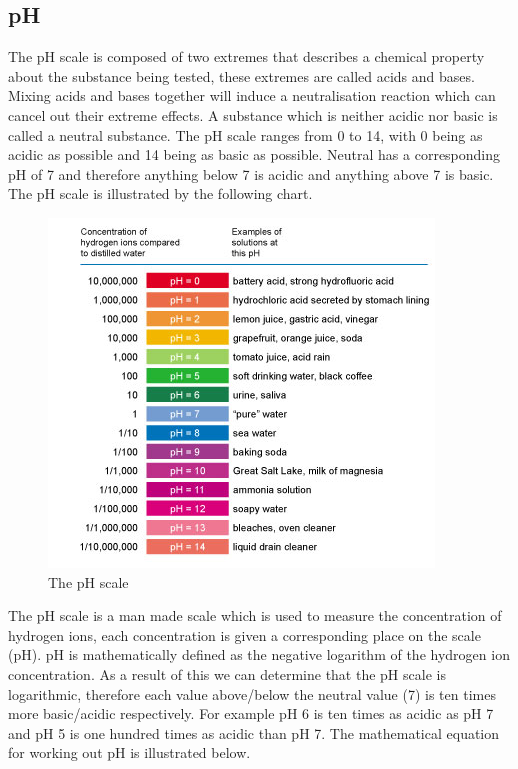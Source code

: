 	\subsection{pH}

The pH scale is composed of two extremes that describes a chemical property about the substance being tested, these extremes are called acids and bases. Mixing acids and bases together will induce a neutralisation reaction which can cancel out their extreme effects. A substance which is neither acidic nor basic is called a neutral substance. The pH scale ranges from 0 to 14, with 0 being as acidic as possible and 14 being as basic as possible. Neutral has a corresponding pH of 7 and therefore anything below 7 is acidic and anything above 7 is basic. The pH scale is illustrated by the following chart.


\begin{figure}[H]
    \includegraphics[width=\textwidth]{./Planning/Images/pHScale.jpg}
    \caption{The pH scale} \label{fig:pH Scale}
\end{figure}

The pH scale is a man made scale which is used to measure the concentration of hydrogen ions, each concentration is given a corresponding place on the scale (pH). pH is mathematically defined as the negative logarithm of the hydrogen ion concentration. As a result of this we can determine that the pH scale is logarithmic, therefore each value above/below the neutral value (7) is ten times more basic/acidic respectively. For example pH 6 is ten times as acidic as pH 7  and pH 5 is one hundred times as acidic than pH 7. The mathematical equation for working out pH is illustrated below.

